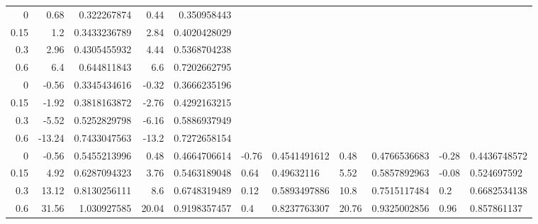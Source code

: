 \begin{tabular}{rrrrr}
0 & 0.68 & 0.322267874 & 0.44 & 0.350958443 \\
0.15 & 1.2 & 0.3433236789 & 2.84 & 0.4020428029 \\
0.3 & 2.96 & 0.4305455932 & 4.44 & 0.5368704238 \\
0.6 & 6.4 & 0.644811843 & 6.6 & 0.7202662795 \\
0 & -0.56 & 0.3345434616 & -0.32 & 0.3666235196 \\
0.15 & -1.92 & 0.3818163872 & -2.76 & 0.4292163215 \\
0.3 & -5.52 & 0.5252829798 & -6.16 & 0.5886937949 \\
0.6 & -13.24 & 0.7433047563 & -13.2 & 0.7272658154 \\
0 & -0.56 & 0.5455213996 & 0.48 & 0.4664706614 & -0.76 & 0.4541491612 & 0.48 & 0.4766536683 & -0.28 & 0.4436748572 \\
0.15 & 4.92 & 0.6287094323 & 3.76 & 0.5463189048 & 0.64 & 0.49632116 & 5.52 & 0.5857892963 & -0.08 & 0.524697592 \\
0.3 & 13.12 & 0.8130256111 & 8.6 & 0.6748319489 & 0.12 & 0.5893497886 & 10.8 & 0.7515117484 & 0.2 & 0.6682534138 \\
0.6 & 31.56 & 1.030927585 & 20.04 & 0.9198357457 & 0.4 & 0.8237763307 & 20.76 & 0.9325002856 & 0.96 & 0.857861137 \\
\end{tabular}
